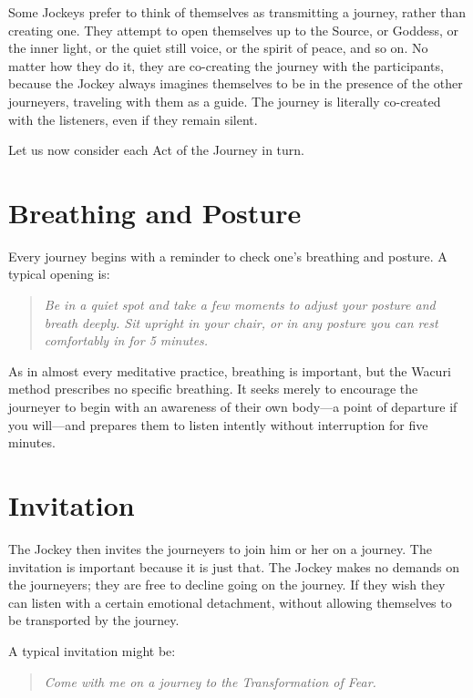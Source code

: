 \documentclass[12pt]{book}
\begin{document}
Some Jockeys prefer to think of themselves as transmitting a journey,
rather than creating one. They attempt to open themselves up to the Source, or
Goddess, or the inner light, or the quiet still voice, or the spirit
of peace, and so on. No matter how they do it, they are co-creating
the journey with the participants, because the Jockey always imagines
themselves to be in the presence of the other journeyers, traveling
with them as a guide. The journey is literally co-created with the
listeners, even if they remain silent.
					
Let us now consider each Act of the Journey in turn.
					
\section{Breathing and Posture}
					
Every journey begins with a reminder to check one’s breathing and
posture. A typical opening is:
					
\begin{quote}{\em Be in a quiet spot and take a few moments to adjust your posture and breath deeply. Sit upright in your chair, or in any posture you can rest comfortably in for 5 minutes.}
  \end{quote}
					
As in almost every meditative practice, breathing is important, but
the Wacuri method prescribes no specific breathing. It seeks merely to
encourage the journeyer to begin with an awareness of their own body---a
point of departure if you will--–and prepares them to listen intently
without interruption for five minutes.
					
\section{Invitation}
					
The Jockey then invites the journeyers to join him or her on a
journey. The invitation is important because it is just that. The
Jockey makes no demands on the journeyers; they are free to decline
going on the journey. If they wish they can listen with a certain
emotional detachment, without allowing themselves to be transported by
the journey.
					
A typical invitation might be:
\begin{quote}{\em 
    Come with me on a journey to the Transformation of Fear.}
  \end{quote}
					
\end{document}

